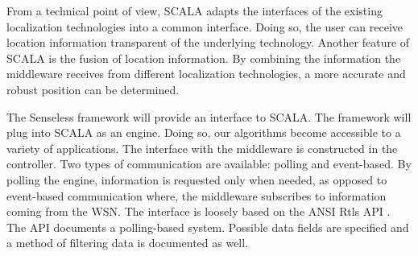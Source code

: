 From a technical point of view, SCALA adapts the interfaces of the existing localization technologies into a common interface. Doing so, the user can receive location information transparent of the underlying technology. 
Another feature of SCALA is the fusion of location information. By combining the information the middleware receives from different localization technologies, a more accurate and robust position can be determined.

The Senseless framework will provide an interface to SCALA. The framework will plug into SCALA as an engine. Doing so, our algorithms become accessible to a variety of applications.
The interface with the middleware is constructed in the controller. Two types of communication are available: polling and event-based. By polling the engine, information is requested only when needed, as opposed to event-based communication where, the middleware subscribes to information coming from the WSN. The interface is loosely based on the ANSI Rtls API \cite{RTLS}.
The API documents a polling-based system. Possible data fields are specified and a method of filtering data is documented as well.

